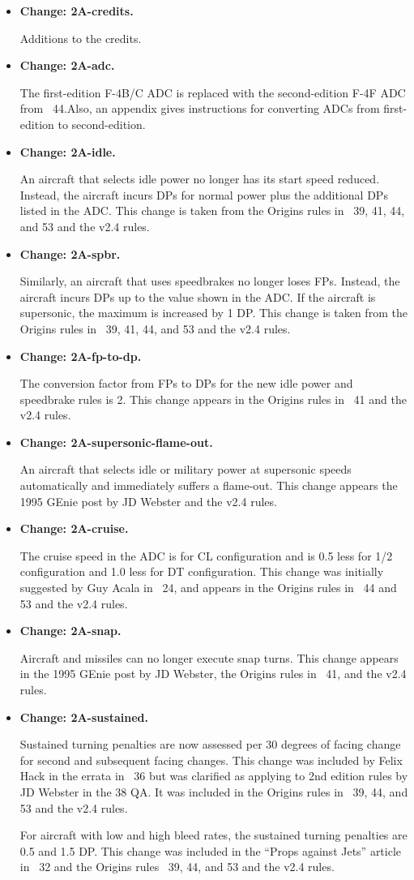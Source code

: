 \documentclass[10pt]{report}
\newcommand{\itemtag}[1]{\item \textbf{Change: #1.}\par}
\begin{document}
\begin{itemize}

    \itemtag{2A-credits} Additions to the credits.

    \itemtag{2A-adc} The first-edition F-4B/C ADC is replaced with the second-edition F-4F ADC from {\APJ}~44.Also, an appendix gives instructions for converting ADCs from first-edition to second-edition.

    \itemtag{2A-idle} An aircraft that selects idle power no longer has its start speed reduced. Instead, the aircraft incurs DPs for normal power plus the additional DPs listed in the ADC. This change is taken from the Origins rules in {\APJ}~39, 41, 44, and 53 and the v2.4 rules. 

    \itemtag{2A-spbr} Similarly, an aircraft that uses speedbrakes no longer loses FPs. Instead, the aircraft incurs DPs up to the value shown in the ADC. If the aircraft is supersonic, the maximum is increased by 1 DP. This change is taken from the Origins rules in {\APJ}~39, 41, 44, and 53 and the v2.4 rules.

    \itemtag{2A-fp-to-dp} The conversion factor from FPs to DPs for the new idle power and speedbrake rules is 2. This change appears in the Origins rules in {\APJ}~41 and the v2.4 rules.

    \itemtag{2A-supersonic-flame-out} An aircraft that selects idle or military power at supersonic speeds automatically and immediately suffers a flame-out. This change appears the 1995 GEnie post by JD Webster and the v2.4 rules.

    \itemtag{2A-cruise} The cruise speed in the ADC is for CL configuration and is 0.5 less for 1/2 configuration and 1.0 less for DT configuration. This change was initially suggested by Guy Acala in {\APJ}~24, and appears in the Origins rules in {\APJ}~44 and 53 and the v2.4 rules.

    \itemtag{2A-snap} Aircraft and missiles can no longer execute snap turns. This change appears in the 1995 GEnie post by JD Webster, the Origins rules in {\APJ}~41, and the v2.4 rules.

    \itemtag{2A-sustained} Sustained turning penalties are now assessed per 30 degrees of facing change for second and subsequent facing changes. This change was included by Felix Hack in the errata in {\APJ}~36 but was clarified as applying to 2nd edition rules by JD Webster in the {\APJ} 38 QA. It was included in the Origins rules in {\APJ}~39, 44, and 53 and the v2.4 rules.

    For aircraft with low and high bleed rates, the sustained turning penalties are 0.5 and 1.5 DP. This change was included in the “Props against Jets” article in {\APJ}~32 and the Origins rules {\APJ}~39, 44, and 53 and the v2.4 rules.


\end{itemize}
\end{document}

